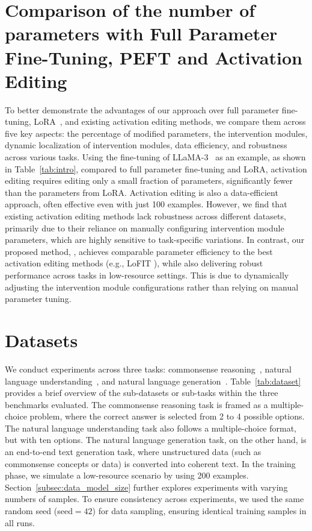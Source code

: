 \section{Comparison of the number of parameters
with Full Parameter Fine-Tuning, PEFT and Activation Editing}
\label{appendix:compare}
To better demonstrate the advantages of our approach over full parameter fine-tuning, LoRA~\cite{hu2021lora}, and existing activation editing methods, we compare them across five key aspects: the percentage of modified parameters, the intervention modules, dynamic localization of intervention modules, data efficiency, and robustness across various tasks.
Using the fine-tuning of LLaMA-3~\cite{dubey2024llama} as an example, as shown in Table~\ref{tab:intro}, compared to full parameter fine-tuning and LoRA, activation editing requires editing only a small fraction of parameters, significantly fewer than the parameters from LoRA.
Activation editing is also a data-efficient approach, often effective even with just 100 examples.
However, we find that existing activation editing methods lack robustness across different datasets, primarily due to their reliance on manually configuring intervention module parameters, which are highly sensitive to task-specific variations.
In contrast, our proposed method, \jola{}, achieves comparable parameter efficiency to the best activation editing methods (e.g., LoFIT \cite{yin2024lofit}), while also delivering robust performance across tasks in low-resource settings.
This is due to dynamically adjusting the intervention module configurations rather than relying on manual parameter tuning.




\section{Datasets}
\label{appendix:dataset}
We conduct experiments across three tasks: commonsense reasoning~\cite{hu-etal-2023-llm}, natural language understanding~\cite{wang2024mmlu}, and natural language generation~\cite{gehrmann-etal-2022-gemv2}.
Table~\ref{tab:dataset} provides a brief overview of the sub-datasets or sub-tasks within the three benchmarks evaluated.
The commonsense reasoning task is framed as a multiple-choice problem, where the correct answer is selected from 2 to 4 possible options.
The natural language understanding task also follows a multiple-choice format, but with ten options.
The natural language generation task, on the other hand, is an end-to-end text generation task, where unstructured data (such as commonsense concepts or data) is converted into coherent text.
In the training phase, we simulate a low-resource scenario by using 200 examples.
Section~\ref{subsec:data_model_size} further explores experiments with varying numbers of samples.
To ensure consistency across experiments, we used the same random seed (seed$=42$) for data sampling, ensuring identical training samples in all runs.

